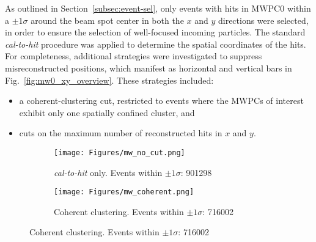 \begin{appendices}
As outlined in Section~\ref{subsec:event-sel}, only events with hits in MWPC0 within a $\pm1\sigma$ around the beam spot center in both the $x$ and $y$ directions were selected, in order to ensure the selection of well-focused incoming particles. The standard \textit{cal-to-hit} procedure was applied to determine the spatial coordinates of the hits.\newline
For completeness, additional strategies were investigated to suppress misreconstructed positions, which manifest as horizontal and vertical bars in Fig.~\ref{fig:mw0_xy_overview}. These strategies included:
\begin{itemize}
    \item a coherent-clustering cut, restricted to events where the MWPCs of interest exhibit only one spatially confined cluster, and
    \item cuts on the maximum number of reconstructed hits in $x$ and $y$.
\end{itemize}
\begin{figure}
\begin{subfigure}{.45\textwidth}
  \centering
  \texttt{[image: Figures/mw\_no\_cut.png]}
  \caption{\textit{cal-to-hit} only. Events within $\pm1\sigma$: 901298}
  \label{fig:sub-first}
\end{subfigure}
\begin{subfigure}{.45\textwidth}
  \centering
  \texttt{[image: Figures/mw\_coherent.png]}
  \caption{Coherent clustering. Events within $\pm1\sigma$: 716002}
  \label{fig:sub-second}
\end{subfigure}


\end{figure}
\end{appendices}
